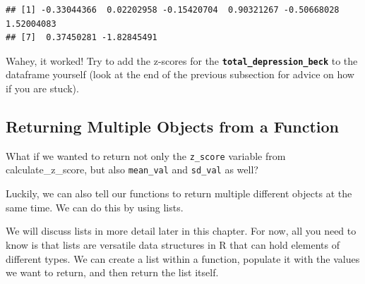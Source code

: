 \documentclass[
]{book}
\newenvironment{Shaded}{\begin{snugshade}}{\end{snugshade}}
\newcommand{\AttributeTok}[1]{\textcolor[rgb]{0.13,0.29,0.53}{#1}}
\newcommand{\CommentTok}[1]{\textcolor[rgb]{0.56,0.35,0.01}{\textit{#1}}}
\newcommand{\ControlFlowTok}[1]{\textcolor[rgb]{0.13,0.29,0.53}{\textbf{#1}}}
\newcommand{\FunctionTok}[1]{\textcolor[rgb]{0.13,0.29,0.53}{\textbf{#1}}}
\newcommand{\NormalTok}[1]{#1}
\newcommand{\OtherTok}[1]{\textcolor[rgb]{0.56,0.35,0.01}{#1}}
\newcommand{\SpecialCharTok}[1]{\textcolor[rgb]{0.81,0.36,0.00}{\textbf{#1}}}
\begin{document}
\begin{Shaded}
\end{Shaded}

\begin{verbatim}
## [1] -0.33044366  0.02202958 -0.15420704  0.90321267 -0.50668028  1.52004083
## [7]  0.37450281 -1.82845491
\end{verbatim}

Wahey, it worked! Try to add the z-scores for the \textbf{\texttt{total\_depression\_beck}} to the dataframe yourself (look at the end of the previous subsection for advice on how if you are stuck).

\hypertarget{returning-multiple-objects-from-a-function}{%
\subsection{Returning Multiple Objects from a Function}\label{returning-multiple-objects-from-a-function}}

What if we wanted to return not only the \texttt{z\_score} variable from calculate\_z\_score, but also \texttt{mean\_val} and \texttt{sd\_val} as well?

Luckily, we can also tell our functions to return multiple different objects at the same time. We can do this by using lists.

We will discuss lists in more detail later in this chapter. For now, all you need to know is that lists are versatile data structures in R that can hold elements of different types. We can create a list within a function, populate it with the values we want to return, and then return the list itself.
\end{document}
